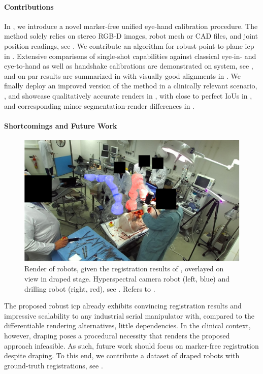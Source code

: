 \paragraph{Contributions} In , we introduce a novel marker-free unified eye-hand calibration procedure. The method solely relies on stereo RGB-D images, robot mesh or CAD files, and joint position readings, see . We contribute an algorithm for robust point-to-plane \acrshort{icp} in . Extensive comparisons of single-shot capabilities against classical eye-in- and eye-to-hand as well as handshake calibrations are demonstrated on system, see , and on-par results are summarized in  with visually good alignments in . We finally deploy an improved version of the method in a clinically relevant scenario, , and showcase qualitatively accurate renders in , with close to perfect IoUs in , and corresponding minor segmentation-render differences in .

\paragraph{Shortcomings and Future Work}
\begin{figure}[tb]
    \centering
    \includegraphics[width=\textwidth]{conclusion/img/draped_ground_truth.pdf}
    \caption{Render of robots, given the registration results of , overlayed on view in draped stage. Hyperspectral camera robot (left, blue) and drilling robot (right, red), see . Refers to .}
    \label{con:fig:draped_ground_truth}
\end{figure}
The proposed robust \acrshort{icp} already exhibits convincing registration results and impressive scalability to any industrial serial manipulator with, compared to the differentiable rendering alternatives, little dependencies. In the clinical context, however, draping poses a procedural necessity that renders the proposed approach infeasible. As such, future work should focus on marker-free registration despite draping. To this end, we contribute a dataset of draped robots with ground-truth registrations, see .

